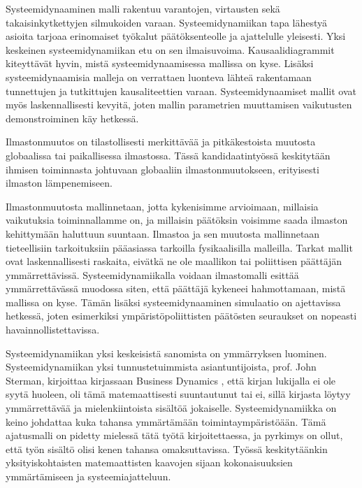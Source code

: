 \documentclass[finnish,12pt,a4paper,pdftex]{article}
\begin{document}
\begin{onehalfspacing}

Systeemidynaaminen malli rakentuu varantojen, virtausten sekä takaisinkytkettyjen silmukoiden varaan. Systeemidynamiikan tapa lähestyä asioita tarjoaa erinomaiset työkalut päätöksenteolle ja ajattelulle yleisesti. Yksi keskeinen systeemidynamiikan etu on sen ilmaisuvoima. Kausaalidiagrammit kiteyttävät hyvin, mistä systeemidynaamisessa mallissa on kyse. Lisäksi systeemidynaamisia malleja on verrattaen luonteva lähteä rakentamaan tunnettujen ja tutkittujen kausaliteettien varaan. Systeemidynaamiset mallit ovat myös laskennallisesti kevyitä, joten mallin parametrien muuttamisen vaikutusten demonstroiminen käy hetkessä.  

Ilmastonmuutos on tilastollisesti merkittävää ja pitkäkestoista muutosta globaalissa tai paikallisessa ilmastossa. Tässä kandidaatintyössä keskitytään ihmisen toiminnasta johtuvaan globaaliin ilmastonmuutokseen, erityisesti ilmaston lämpenemiseen. 

Ilmastonmuutosta mallinnetaan, jotta kykenisimme arvioimaan, millaisia vaikutuksia toiminnallamme on, ja millaisin päätöksin voisimme saada ilmaston kehittymään haluttuun suuntaan. Ilmastoa ja sen muutosta mallinnetaan tieteellisiin tarkoituksiin pääasiassa tarkoilla fysikaalisilla malleilla. Tarkat mallit ovat laskennallisesti raskaita, eivätkä ne ole maallikon tai poliittisen päättäjän ymmärrettävissä. Systeemidynamiikalla voidaan ilmastomalli esittää ymmärrettävässä muodossa siten, että päättäjä kykeneei hahmottamaan, mistä mallissa on kyse. Tämän lisäksi systeemidynaaminen simulaatio on ajettavissa hetkessä, joten esimerkiksi ympäristöpoliittisten päätösten seuraukset on nopeasti havainnollistettavissa. 

Systeemidynamiikan yksi keskeisistä sanomista on ymmärryksen luominen. Systeemidynamiikan yksi tunnustetuimmista asiantuntijoista, prof. John Sterman, kirjoittaa kirjassaan Business Dynamics \cite{Sterman2000}, että kirjan lukijalla ei ole syytä huoleen, oli tämä matemaattisesti suuntautunut tai ei, sillä kirjasta löytyy ymmärrettävää ja mielenkiintoista sisältöä jokaiselle. Systeemidynamiikka on keino johdattaa kuka tahansa ymmärtämään toimintaympäristöään. Tämä ajatusmalli on pidetty mielessä tätä työtä kirjoitettaessa, ja pyrkimys on ollut, että työn sisältö olisi kenen tahansa omaksuttavissa. Työssä keskitytäänkin yksityiskohtaisten matemaattisten kaavojen sijaan kokonaisuuksien ymmärtämiseen ja systeemiajatteluun. 


\end{onehalfspacing}
\end{document}
